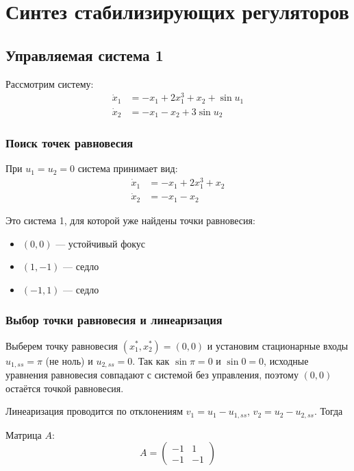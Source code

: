 \section*{Синтез стабилизирующих регуляторов}

\subsection*{Управляемая система 1}

Рассмотрим систему:
\begin{align}
\dot{x}_1 &= -x_1 + 2x_1^3 + x_2 + \sin u_1 \\
\dot{x}_2 &= -x_1 - x_2 + 3\sin u_2
\end{align}

\subsubsection*{Поиск точек равновесия}

При $u_1 = u_2 = 0$ система принимает вид:
\begin{align}
\dot{x}_1 &= -x_1 + 2x_1^3 + x_2 \\
\dot{x}_2 &= -x_1 - x_2
\end{align}

Это система 1, для которой уже найдены точки равновесия:
\begin{itemize}
\item $(0, 0)$ --- устойчивый фокус
\item $(1, -1)$ --- седло
\item $(-1, 1)$ --- седло
\end{itemize}

\subsubsection*{Выбор точки равновесия и линеаризация}

Выберем точку равновесия $(x_1^*,x_2^*) = (0,0)$ и установим стационарные входы $u_{1,ss} = \pi$ (не ноль) и $u_{2,ss} = 0$. Так как $\sin\pi = 0$ и $\sin 0 = 0$, исходные уравнения равновесия совпадают с системой без управления, поэтому $(0,0)$ остаётся точкой равновесия.

Линеаризация проводится по отклонениям $v_1 = u_1 - u_{1,ss}$, $v_2 = u_2 - u_{2,ss}$. Тогда

Матрица $A$:
$$A = \begin{pmatrix} -1 & 1 \\ -1 & -1 \end{pmatrix}$$

